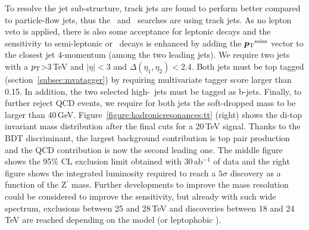 To resolve the jet sub-structure, track jets are found to perform better compared to particle-flow jets, thus the \rsg\ and \Zptt\ searches are using track jets. As no lepton veto is applied, there is also some acceptance for leptonic decays and the sensitivity to semi-leptonic or \ttbar\ decays is enhanced by adding the $\metvec$ vector to the closest jet 4-momentum (among the two leading jets).
We require two jets with a $p_{\text{T}}$>3\,TeV and $|\eta|<3$ and $\Delta(\eta_1,\eta_2)<2.4$. Both jets must be top tagged (section~\ref{subsec:mvatagger}) by requiring multivariate tagger score larger than 0.15. In addition, the two selected high-\pt\ jets must be tagged as b-jets. Finally, to further reject QCD events, we require for both jets the soft-dropped mass to be larger than 40\,GeV. Figure~\ref{figure:hadronicresonances:tt} (right) shows the di-top invariant mass distribution after the final cuts for a 20\,TeV signal. Thanks to the BDT discriminant, the largest background contribution is top pair production and the QCD contribution is now the second leading one. The middle figure shows the 95\% CL exclusion limit obtained with 30\,ab$^{-1}$ of data and the right figure shows the integrated luminosity required to reach a $5\sigma$ discovery as a function of the Z$^\prime$ mass. Further developments to improve the mass resolution could be considered to improve the sensitivity, but already with such wide spectrum, exclusions between 25 and 28\,TeV and discoveries between 18 and 24\,TeV are reached depending on the model (\ZpSSM or leptophobic \ZpTC).

